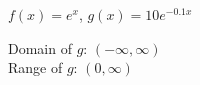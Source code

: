 {$f(x) = e^{x}$, $g(x) = 10e^{-0.1x}$ \label{graphexplast}}
{Domain of $g$:  $(-\infty, \infty)$\\
 Range of $g$:  $(0, \infty)$\\
 
\begin{center}
\end{center}}



